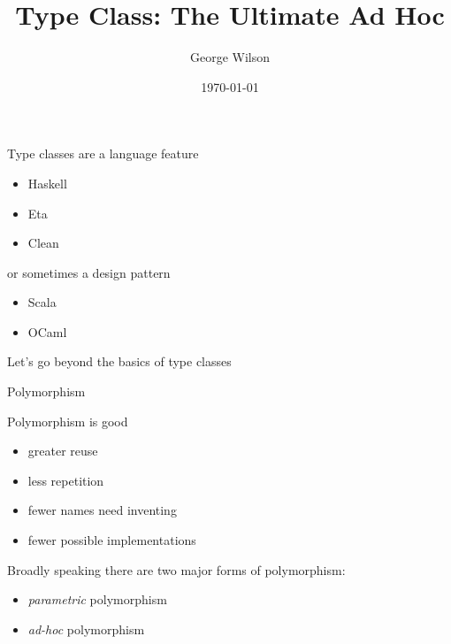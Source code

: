 \documentclass[usenames,dvipsnames,svgnames,table,aspectratio=169,mathserif]{beamer}
\title[Type Class: The Ultimate Ad Hoc]{Type Class: The Ultimate Ad Hoc} %
\author{George Wilson} %
\institute[] %
{
Data61/CSIRO\\ %
\medskip
\href{george.wilson@data61.csiro.au}{george.wilson@data61.csiro.au} %
}
\date{\today} %
\begin{document}


\begin{frame}
\titlepage %
\end{frame}


\begin{frame}

Type classes are a language feature

\begin{itemize}
\item Haskell
\item Eta
\item Clean
\end{itemize}

\pause

or sometimes a design pattern

\begin{itemize}
\item Scala
\item OCaml
\end{itemize}

\end{frame}


\begin{frame}
Let's go beyond the basics of type classes
\end{frame}




\begin{frame}
\begin{center}
\huge{Polymorphism}
\end{center}
\end{frame}


\begin{frame}
\begin{center}
Polymorphism is good


\begin{itemize}
\item greater reuse
\item less repetition
\item fewer names need inventing
\item fewer possible implementations
\end{itemize}
\end{center}
\end{frame}


\begin{frame}
Broadly speaking there are two major forms of polymorphism:

\begin{itemize}
\item {\it parametric} polymorphism
\item {\it ad-hoc} polymorphism
\end{itemize}
\end{frame}
\end{document}
